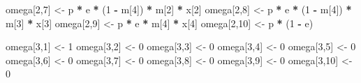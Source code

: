 \documentclass[
  12pt,
]{krantz}
\newenvironment{Shaded}{\begin{snugshade}}{\end{snugshade}}
\newcommand{\DecValTok}[1]{\textcolor[rgb]{0.00,0.00,0.81}{#1}}
\newcommand{\NormalTok}[1]{#1}
\newcommand{\OtherTok}[1]{\textcolor[rgb]{0.56,0.35,0.01}{#1}}
\newcommand{\SpecialCharTok}[1]{\textcolor[rgb]{0.81,0.36,0.00}{\textbf{#1}}}
\begin{document}
\begin{Shaded}
\begin{Highlighting}[]
\NormalTok{omega[}\DecValTok{2}\NormalTok{,}\DecValTok{7}\NormalTok{] }\OtherTok{\textless{}{-}}\NormalTok{ p }\SpecialCharTok{*}\NormalTok{ e }\SpecialCharTok{*}\NormalTok{ (}\DecValTok{1} \SpecialCharTok{{-}}\NormalTok{ m[}\DecValTok{4}\NormalTok{]) }\SpecialCharTok{*}\NormalTok{ m[}\DecValTok{2}\NormalTok{] }\SpecialCharTok{*}\NormalTok{ x[}\DecValTok{2}\NormalTok{]     }
\NormalTok{omega[}\DecValTok{2}\NormalTok{,}\DecValTok{8}\NormalTok{] }\OtherTok{\textless{}{-}}\NormalTok{ p }\SpecialCharTok{*}\NormalTok{ e }\SpecialCharTok{*}\NormalTok{ (}\DecValTok{1} \SpecialCharTok{{-}}\NormalTok{ m[}\DecValTok{4}\NormalTok{]) }\SpecialCharTok{*}\NormalTok{ m[}\DecValTok{3}\NormalTok{] }\SpecialCharTok{*}\NormalTok{ x[}\DecValTok{3}\NormalTok{]   }
\NormalTok{omega[}\DecValTok{2}\NormalTok{,}\DecValTok{9}\NormalTok{] }\OtherTok{\textless{}{-}}\NormalTok{ p }\SpecialCharTok{*}\NormalTok{ e }\SpecialCharTok{*}\NormalTok{ m[}\DecValTok{4}\NormalTok{] }\SpecialCharTok{*}\NormalTok{ x[}\DecValTok{4}\NormalTok{]   }
\NormalTok{omega[}\DecValTok{2}\NormalTok{,}\DecValTok{10}\NormalTok{] }\OtherTok{\textless{}{-}}\NormalTok{ p }\SpecialCharTok{*}\NormalTok{ (}\DecValTok{1} \SpecialCharTok{{-}}\NormalTok{ e)      }

\NormalTok{omega[}\DecValTok{3}\NormalTok{,}\DecValTok{1}\NormalTok{] }\OtherTok{\textless{}{-}} \DecValTok{1}                                  
\NormalTok{omega[}\DecValTok{3}\NormalTok{,}\DecValTok{2}\NormalTok{] }\OtherTok{\textless{}{-}} \DecValTok{0}     
\NormalTok{omega[}\DecValTok{3}\NormalTok{,}\DecValTok{3}\NormalTok{] }\OtherTok{\textless{}{-}} \DecValTok{0}     
\NormalTok{omega[}\DecValTok{3}\NormalTok{,}\DecValTok{4}\NormalTok{] }\OtherTok{\textless{}{-}} \DecValTok{0}     
\NormalTok{omega[}\DecValTok{3}\NormalTok{,}\DecValTok{5}\NormalTok{] }\OtherTok{\textless{}{-}} \DecValTok{0}     
\NormalTok{omega[}\DecValTok{3}\NormalTok{,}\DecValTok{6}\NormalTok{] }\OtherTok{\textless{}{-}} \DecValTok{0}     
\NormalTok{omega[}\DecValTok{3}\NormalTok{,}\DecValTok{7}\NormalTok{] }\OtherTok{\textless{}{-}} \DecValTok{0}     
\NormalTok{omega[}\DecValTok{3}\NormalTok{,}\DecValTok{8}\NormalTok{] }\OtherTok{\textless{}{-}} \DecValTok{0}     
\NormalTok{omega[}\DecValTok{3}\NormalTok{,}\DecValTok{9}\NormalTok{] }\OtherTok{\textless{}{-}} \DecValTok{0}     
\NormalTok{omega[}\DecValTok{3}\NormalTok{,}\DecValTok{10}\NormalTok{] }\OtherTok{\textless{}{-}} \DecValTok{0}     
\end{Highlighting}
\end{Shaded}
\end{document}

